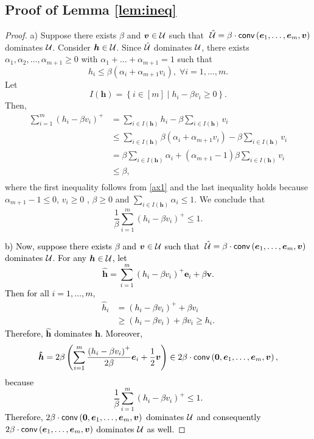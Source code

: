 \documentclass[11pt]{article}
\theoremstyle{plain}
\theoremstyle{definition}
\numberwithin{equation}{section}%
\numberwithin{equation}{section}%
\newcommand{\mb}[1]{\ensuremath{\boldsymbol{#1}}}
\newcommand*{\red}{\textcolor{black}}
\begin{document}
\begin{appendix}
\section{Proof of Lemma \ref{lem:ineq}}\label{apx-proofs:lem:ineq}
 \begin{proof}
a)
Suppose there exists $ \beta $ and $ \mb v \in {\cal U}$ such that
$ \;  \hat{\cal U} = \beta \cdot {\sf conv } \left( \mb e_1,\ldots,\mb e_m, \mb v \right)$ dominates $\cal U $.
Consider $\mb h \in {\cal U }$. Since  $\hat{\cal U}$ dominates  ${\cal U}$, there exists $ \alpha_1, \alpha_2,\ldots,\alpha_{m+1} \geq 0$ with $\alpha_1 + \ldots + \alpha_{m+1} =1$ such that \begin{equation} \label{ax1}
 h_i \leq \beta \left( \alpha_i + \alpha_{m+1}  v_i  \right), \; \forall i =1,\ldots,m.
\end{equation}
Let
$$ I (\mb h )= \left\{ i \in [m] \; \bigg\vert \;  h_i - \beta v_i \geq 0 \right\}.$$ Then,
 \begin{align*}
\sum_{i=1}^m \left( h_i -\beta v_i \right)^{+} &= \underset {i \in I (\mb h ) } \sum  h_i - \beta \underset {i \in I (\mb h ) } \sum v_i \\
& \leq  \sum_{i\in I (\mb h )}  \beta \left( \alpha_i + \alpha_{m+1}  v_i  \right)  - \beta \underset {i \in I (\mb h )} \sum v_i\\
& = \beta \sum_{i\in I (\mb h )}   \alpha_i +  \left( \alpha_{m+1} -1\right) \beta \underset {i \in I (\mb h ) } \sum  v_i\\
& \leq \beta, \\
\end{align*}
where the first inequality follows from \eqref{ax1} and the last inequality holds because $ \alpha_{m+1} -1 \leq 0$, $ v_i \geq 0$ , $\beta \geq 0$ and $ \sum_{i\in I (\mb h )}   \alpha_i \leq 1$.
We conclude that
  $$  \frac{1}{\beta} \sum_{i=1}^m \left( h_i -\beta v_i \right)^{+} \leq 1.$$

\red{b) Now, suppose there exists $ \beta $ and $ \mb v \in {\cal U}$ such that
$ \;  \hat{\cal U} = \beta \cdot {\sf conv } \left( \mb e_1,\ldots,\mb e_m, \mb v \right)$ dominates $\cal U $.
For any $\mb h \in {\cal U}$, let
\[ \mb{\hat h} =  \sum_{i=1}^m \left( h_i -\beta v_i  \right)^{+} \mb e_i + \beta \mb v.\]
Then for all $i=1,\ldots,m$,
\begin{align*}
\hat{h}_i  &=  \left( h_i -\beta v_i  \right)^{+} + \beta  v_i \\
&\geq \left( h_i -\beta v_i  \right) + \beta  v_i \geq h_i .
\end{align*}
Therefore, $\mb{\hat h}$ dominates $\mb h$. Moreover,
\[ \mb{\hat h} = 2\beta \left( \sum_{i=1}^m \frac{\left( h_i -\beta v_i  \right)^{+}}{2 \beta} \mb e_i + \frac{1}{2}\mb v \right) \in 2\beta \cdot {\sf conv } \left( \mb 0, \mb e_1,\ldots,\mb e_m, \mb v \right), \]
because
$$  \frac{1}{\beta} \sum_{i=1}^m \left( h_i - \beta v_i  \right)^{+}  \leq 1. $$
Therefore, $2\beta \cdot {\sf conv } \left(\mb 0,  \mb e_1,\ldots,\mb e_m, \mb v \right)  $ dominates ${\cal U} $ and consequently \\$2\beta \cdot {\sf conv } \left( \mb e_1,\ldots,\mb e_m, \mb v \right)  $ dominates ${\cal U} $ as well.}
     \end{proof}


\end{appendix}
\end{document}
